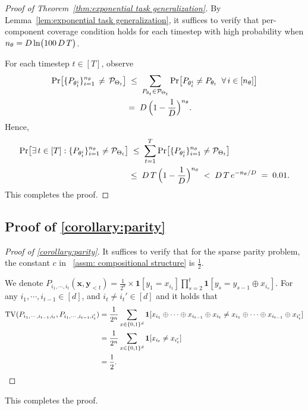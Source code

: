 \begin{proof}[Proof of Theorem~\ref{thm:exponential task generalization}]
By Lemma~\ref{lem:exponential task generalization}, it suffices to verify that per-component coverage condition holds for each timestep with high probability when $n_\theta = D \ln\bigl(100\,D\,T\bigr)$.

For each timestep $t\in[T]$, observe
\begin{align*}
\Pr\bigl[
  \{P_{\theta_t^i}\}_{i=1}^{n_\theta} \,\neq\, {\mathcal{P}}_{\Theta_t}
\bigr]
&\;\le\;
\sum_{P_{\theta_t}\in {\mathcal{P}}_{\Theta_t}}
\Pr\bigl[
  P_{\theta_t^i} \neq P_{\theta_t} \;\;\forall\,i \in [n_\theta]
\bigr]
\\
&=\;
D \,\Bigl(1 - \frac{1}{D}\Bigr)^{n_\theta}.
\end{align*}
Hence,
\begin{align*}
\Pr\bigl[
  \exists\,t \in [T]:
  \{P_{\theta_t^i}\}_{i=1}^{n_\theta} \neq {\mathcal{P}}_{\Theta_t}
\bigr]
&\;\le\;
\sum_{t=1}^{T}
\Pr\bigl[
  \{P_{\theta_t^i}\}_{i=1}^{n_\theta} \neq {\mathcal{P}}_{\Theta_t}
\bigr]
\\
&\leq\;
D\,T
\,\Bigl(1 - \frac{1}{D}\Bigr)^{n_\theta}
\;<\;
D\,T \,e^{-n_\theta/D}
\;=\;
0.01.
\end{align*}
This completes the proof.
\end{proof}






\subsection{Proof of \cref{corollary:parity}}

\begin{proof}[Proof of \cref{corollary:parity}]
It suffices to verify that for the sparse parity problem, the constant $c$ in ~\cref{assm: compositional structure} is $\frac 12$. 

We denote $P_{ i_1,\cdots,i_t}(\bm x,\bm y_{<t}) = \frac 1 {2^d} \times \mathbf 1  [y_1 = x_{i_1}]\prod_{s=2}^t \mathbf 1[y_s = y_{s-1}\oplus x_{i_s}]$.
For any $i_1,\cdots,i_{t-1}\in [d]$, and $i_{t}\neq i_{t}'\in [d]$ and  it holds that 
\begin{align*}
{\mathrm{TV}}(P_{i_1,\cdots,i_{t-1}, i_t},P_{i_1,\cdots,i_{t-1},i_t'})&=\frac 1 {2^n } \sum_{x\in \{0,1\}^d}\mathbf 1 [x_{i_1}\oplus\cdots\oplus x_{i_{t-1}}\oplus x_{i_t}\neq x_{i_1}\oplus\cdots\oplus x_{i_{t-1}}\oplus x_{i_t'}]\\
&=\frac 1 {2^n }\sum_{x\in \{0,1\}^d} \mathbf 1[x_{i_{t}}\neq  x_{i_{t}'}]\\
&=\frac 12 .
\end{align*}
\end{proof}
This completes the proof.